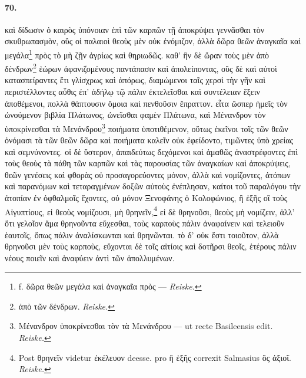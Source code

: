 \documentclass[a4paper, 11pt, oneside, polutonikogreek, german]{article}
\begin{document}
\paragraph{70.}
καὶ δίδωσιν ὁ καιρὸς ὑπόνοιαν ἐπὶ τῶν καρπῶν τῇ ἀποκρύψει γεννᾶσθαι τὸν σκυθρωπασμὸν, οὓς οἱ παλαιοὶ θεοὺς μὲν οὐκ ἐνόμιζον, ἀλλὰ δῶρα θεῶν ἀναγκαῖα καὶ μεγάλα\footnote{f. δῶρα θεῶν μεγάλα καὶ ἀναγκαῖα πρὸς --- \emph{Reiske.}} πρὸς τὸ μὴ ζῇν ἀγρίως καὶ θηριωδῶς. καθ' ἣν δὲ ὥραν τοὺς μὲν ἀπὸ δένδρων\footnote{ἀπὸ τῶν δένδρων. \emph{Reiske.}} ἑώρων ἀφανιζομένους παντάπασιν καὶ ἀπολείποντας, οὓς δὲ καὶ αὐτοὶ κατασπείραντες ἔτι γλίσχρως καὶ ἀπόρως, διαμώμενοι ταῖς χερσὶ τὴν γῆν καὶ περιστέλλοντες αὖθις ἐπ' ἀδήλῳ τῷ πάλιν ἐκτελεῖσθαι καὶ συντέλειαν ἕξειν ἀποθέμενοι, πολλὰ θάπτουσιν ὅμοια καὶ πενθοῦσιν ἔπραττον. εἶτα ὥσπερ ἡμεῖς τὸν ὠνούμενον βιβλία Πλάτωνος, ὠνεῖσθαι φαμὲν Πλάτωνα, καὶ Μένανδρον τὸν ὑποκρίνεσθαι τὰ Μενάνδρου\footnote{Μένανδρον ὑποκρίνεσθαι τὸν τὰ Μενάνδρου --- ut recte Basileensis edit. \emph{Reiske.}} ποιήματα ὑποτιθέμενον, οὕτως ἐκεῖνοι τοῖς τῶν θεῶν ὀνόμασι τὰ τῶν θεῶν δῶρα καὶ ποιήματα καλεῖν οὐκ ἐφείδοντο, τιμῶντες ὑπὸ χρείας καὶ σεμνύνοντες. οἱ δὲ ὕστερον, ἀπαιδεύτως δεχόμενοι καὶ ἀμαθῶς ἀναστρέφοντες ἐπὶ τοὺς θεοὺς τὰ πάθη τῶν καρπῶν καὶ τὰς παρουσίας τῶν ἀναγκαίων καὶ ἀποκρύψεις, θεῶν γενέσεις καὶ φθορὰς οὐ προσαγορεύοντες μόνον, ἀλλὰ καὶ νομίζοντες, ἀτόπων καὶ παρανόμων καὶ τεταραγμένων δοξῶν αὑτοὺς ἐνέπλησαν, καίτοι τοῦ παραλόγου τὴν ἀτοπίαν ἐν ὀφθαλμοῖς ἔχοντες, οὐ μόνον Ξενοφάνης ὁ Κολοφώνιος, ἢ ἑξῆς οἳ τοὺς Αἰγυπτίους, εἰ θεοὺς νομίζουσι, μὴ θρηνεῖν,\footnote{Post θρηνεῖν videtur ἐκέλευον deesse. pro ἢ ἑξῆς correxit Salmasius ὃς ἀξιοῖ. \emph{Reiske.}} εἰ δὲ θρηνοῦσι, θεοὺς μὴ νομίζειν, ἀλλ' ὅτι γελοῖον ἅμα θρηνοῦντα εὔχεσθαι, τοὺς καρποὺς πάλιν ἀναφαίνειν καὶ τελειοῦν ἑαυτοῖς, ὅπως πάλιν ἀναλίσκωνται καὶ θρηνῶνται. τὸ δ' οὐκ ἔστι τοιοῦτον, ἀλλὰ θρηνοῦσι μὲν τοὺς καρποὺς, εὔχονται δὲ τοῖς αἰτίοις καὶ δοτῆρσι θεοῖς, ἑτέρους πάλιν νέους ποιεῖν καὶ ἀναφύειν ἀντὶ τῶν ἀπολλυμένων.
\end{document}

